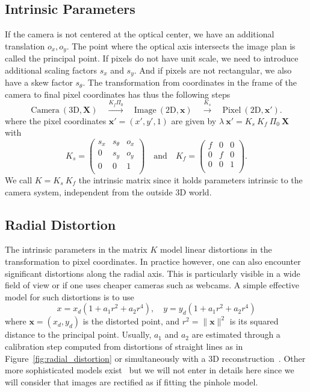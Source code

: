 \subsection{Intrinsic Parameters}%
\label{sub:intrinsic_parameters}


If the camera is not centered at the optical center, we have an additional
translation $o_x, o_y$. The point where the optical axis intersects
the image plan is called the principal point.
If pixels do not have unit scale, we need to introduce
additional scaling factors $s_x$ and $s_y$.
And if pixels are not rectangular, we also have a skew factor $s_{\theta}$.
The transformation from coordinates in the frame of the camera
to final pixel coordinates has thus the following steps
\[
	\text{Camera}\ (\text{3D}, \bm{X})
		\quad \overset{K_f\Pi_0}{\longrightarrow} \quad
			\text{Image}\ (\text{2D}, \bm{x})
		\quad \overset{K_s}{\longrightarrow} \quad
			\text{Pixel}\ (\text{2D}, \bm{x'}).
\]
where the pixel coordinates $\bm{x'} = (x',y',1)$ are given by
$\lambda\ \bm{x'} = K_s\ K_f\ \Pi_0\ \bm{X}$
with
\[K_s = \begin{pmatrix}
		s_x & s_{\theta} & o_x \\
		0 & s_y & o_y \\
		0 & 0 & 1 \\
	\end{pmatrix}
	\quad \text{and} \quad K_f =
	\begin{pmatrix}
		f & 0 & 0 \\
		0 & f & 0 \\
		0 & 0 & 1 \\
	\end{pmatrix}.
\]
We call $K = K_s\ K_f$ the intrinsic matrix since it holds
parameters intrinsic to the camera system, independent from
the outside 3D world.


\subsection{Radial Distortion}%
\label{sub:radial_distortion}

The intrinsic parameters in the matrix $K$ model linear distortions
in the transformation to pixel coordinates.
In practice however, one can also encounter significant
distortions along the radial axis.
This is particularly visible in a wide field of view
or if one uses cheaper cameras such as webcams.
A simple effective model for such distortions is to use
\[
	x = x_d ( 1 + a_1 r^2 + a_2 r^4 ),\quad
	y = y_d ( 1 + a_1 r^2 + a_2 r^4 )
\]
where $\bm{x} = (x_d, y_d)$ is the distorted point,
and $r^2 = \|\bm{x}\|^2$ is its squared distance to the principal point.
Usually, $a_1$ and $a_2$ are estimated through a calibration step computed from
distortions of straight lines as in Figure~\ref{fig:radial_distortion}
or simultaneously with a 3D reconstruction~\cite{stein1997lens, fitzgibbon2001simultaneous}.
Other more sophisticated models exist~\cite{devernay1995automatic}
but we will not enter in details here since we will consider
that images are rectified as if fitting the pinhole model.

